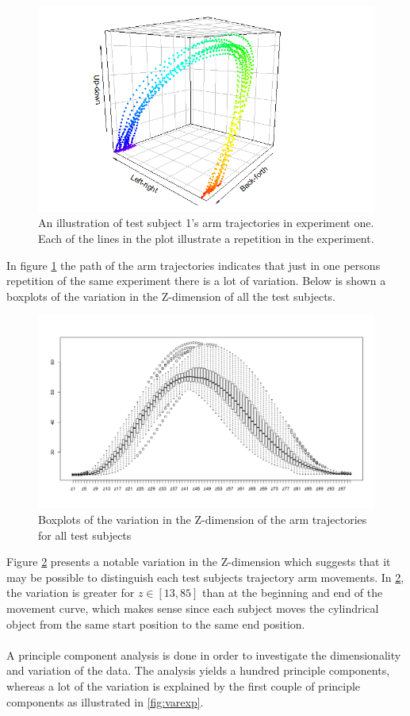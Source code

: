 \documentclass[11pt, fleqn, titlepage]{article}
\begin{document}
\begin{figure}[H]
	\centering
	\includegraphics[scale=0.6]{billeder/Rplot.png}
	\caption{An illustration of test subject 1's arm trajectories in experiment one. Each of the lines in the plot illustrate a repetition in the experiment. }
	\label{fig:rplot}
\end{figure}

In figure \ref{fig:rplot} the path of the arm trajectories indicates that just in one persons repetition of the same experiment there is a lot of variation. Below is shown a boxplots of the variation in the Z-dimension of all the test subjects.

\begin{figure}[H]
	\centering
	\includegraphics[width=0.7\linewidth]{billeder/boxplot_z.pdf}
	\caption{Boxplots of the variation in the Z-dimension of the arm trajectories for all test subjects}
	\label{fig:boxplotz}
\end{figure}

Figure \ref{fig:boxplotz} presents a notable variation in the Z-dimension which suggests that it may be possible to distinguish each test subjects trajectory arm movements. In \ref{fig:boxplotz}, the variation is greater for $ z \in [13,85] $ than at the beginning and end of the movement curve, which makes sense since each subject moves the cylindrical object from the same start position to the same end position.
\\\\
A principle component analysis is done in order to investigate the dimensionality and variation of the data. The analysis yields a hundred principle components, whereas a lot of the variation is explained by the first couple of principle components as illustrated in \ref{fig:varexp}.
\end{document}
